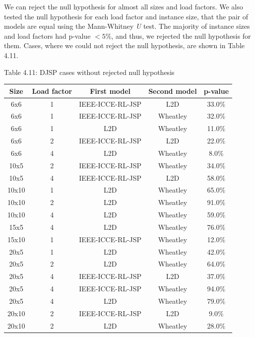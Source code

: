 We can reject the null hypothesis for almost all sizes and load factors. We also tested the null hypothesis for each load factor and instance size, that the pair of models are equal using the Mann-Whitney \textit{U} test. The majority of instance sizes and load factors had p-value $< 5\%$, and thus, we rejected the null hypothesis for them. Cases, where we could not reject the null hypothesis, are shown in Table 4.11.

\begin{table}
    Table 4.11: DJSP cases without rejected null hypothesis\\
    \vspace{1mm}
    \label{table:4.9}
    \begin{tabular}{ccccc}
        \toprule
        Size & Load factor & First model & Second model & p-value \\
        \midrule
        6x6 & 1 & IEEE-ICCE-RL-JSP & L2D & 33.0$\%$ \\
        6x6 & 1 & IEEE-ICCE-RL-JSP & Wheatley & 32.0$\%$ \\
        6x6 & 1 & L2D & Wheatley & 11.0$\%$ \\
        6x6 & 2 & IEEE-ICCE-RL-JSP & L2D & 22.0$\%$ \\
        6x6 & 4 & L2D & Wheatley & 8.0$\%$ \\
        10x5 & 2 & IEEE-ICCE-RL-JSP & Wheatley & 34.0$\%$ \\
        10x5 & 4 & IEEE-ICCE-RL-JSP & L2D & 58.0$\%$ \\
        10x10 & 1 & L2D & Wheatley & 65.0$\%$ \\
        10x10 & 2 & L2D & Wheatley & 91.0$\%$ \\
        10x10 & 4 & L2D & Wheatley & 59.0$\%$ \\
        15x5 & 4 & L2D & Wheatley & 76.0$\%$ \\
        15x10 & 1 & IEEE-ICCE-RL-JSP & Wheatley & 12.0$\%$ \\
        20x5 & 1 & L2D & Wheatley & 42.0$\%$ \\
        20x5 & 2 & L2D & Wheatley & 64.0$\%$ \\
        20x5 & 4 & IEEE-ICCE-RL-JSP & L2D & 37.0$\%$ \\
        20x5 & 4 & IEEE-ICCE-RL-JSP & Wheatley & 94.0$\%$ \\
        20x5 & 4 & L2D & Wheatley & 79.0$\%$ \\
        20x10 & 2 & IEEE-ICCE-RL-JSP & L2D & 9.0$\%$ \\
        20x10 & 2 & L2D & Wheatley & 28.0$\%$ \\

\end{tabular}
\end{table}
